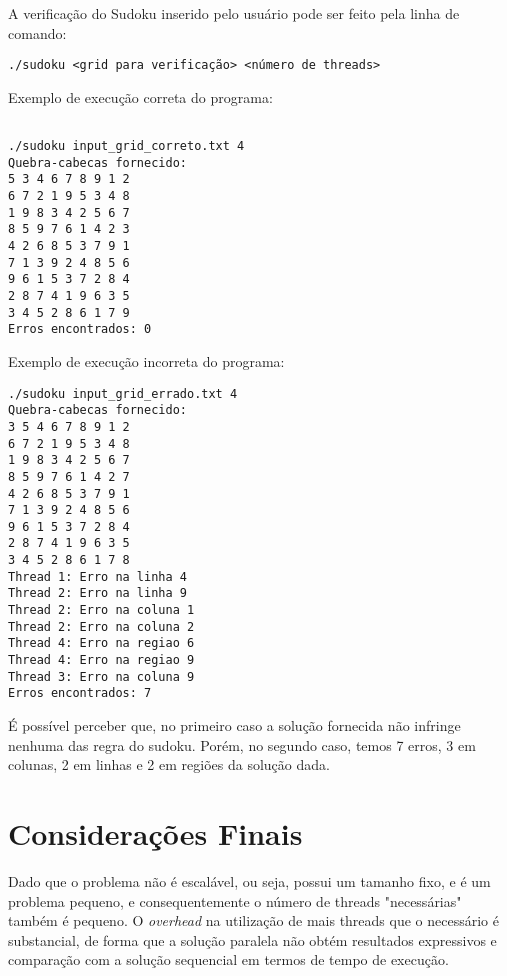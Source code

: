 \documentclass[a4paper, 12pt]{article}
\begin{document}
A verificação do Sudoku inserido pelo usuário pode ser feito pela linha de comando:
\begin{verbatim}
./sudoku <grid para verificação> <número de threads>
\end{verbatim}

Exemplo de execução correta do programa:

\begin{verbatim}

./sudoku input_grid_correto.txt 4
Quebra-cabecas fornecido:
5 3 4 6 7 8 9 1 2
6 7 2 1 9 5 3 4 8
1 9 8 3 4 2 5 6 7
8 5 9 7 6 1 4 2 3
4 2 6 8 5 3 7 9 1
7 1 3 9 2 4 8 5 6
9 6 1 5 3 7 2 8 4
2 8 7 4 1 9 6 3 5
3 4 5 2 8 6 1 7 9
Erros encontrados: 0
\end{verbatim}

Exemplo de execução incorreta do programa:

\begin{verbatim}
./sudoku input_grid_errado.txt 4
Quebra-cabecas fornecido:
3 5 4 6 7 8 9 1 2
6 7 2 1 9 5 3 4 8
1 9 8 3 4 2 5 6 7
8 5 9 7 6 1 4 2 7
4 2 6 8 5 3 7 9 1
7 1 3 9 2 4 8 5 6
9 6 1 5 3 7 2 8 4
2 8 7 4 1 9 6 3 5
3 4 5 2 8 6 1 7 8
Thread 1: Erro na linha 4
Thread 2: Erro na linha 9
Thread 2: Erro na coluna 1
Thread 2: Erro na coluna 2
Thread 4: Erro na regiao 6
Thread 4: Erro na regiao 9
Thread 3: Erro na coluna 9
Erros encontrados: 7
\end{verbatim}

É possível perceber que, no primeiro caso a solução fornecida não infringe
nenhuma das regra do sudoku. Porém, no segundo caso, temos 7 erros, 3 em
colunas, 2 em linhas e 2 em regiões da solução dada.

\section{Considerações Finais}
Dado que o problema não é escalável, ou seja, possui um tamanho fixo, e é um
problema pequeno, e consequentemente o número de threads "necessárias" também é 
pequeno. O \textit{overhead} na utilização de mais threads que o necessário é 
substancial, de forma que a solução paralela não obtém resultados expressivos 
e comparação com a solução sequencial em termos de tempo de execução.
\end{document}
